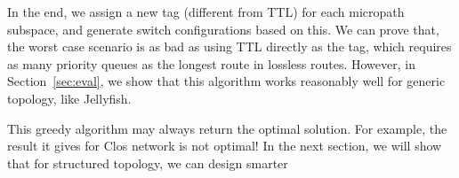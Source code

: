 In the end, we assign a new tag (different from TTL) for each micropath subspace, and generate switch configurations
based on this. We can prove that, the worst case scenario is as bad as using TTL directly as the tag, which requires
as many priority queues as the longest route in lossless routes. However,
in Section~\ref{sec:eval}, we show that this algorithm works reasonably well for generic topology, like Jellyfish. 

This greedy algorithm may always return the optimal solution. For example, the result it gives for Clos network is not 
optimal! In the next section, we will show that for structured topology, we can design smarter 